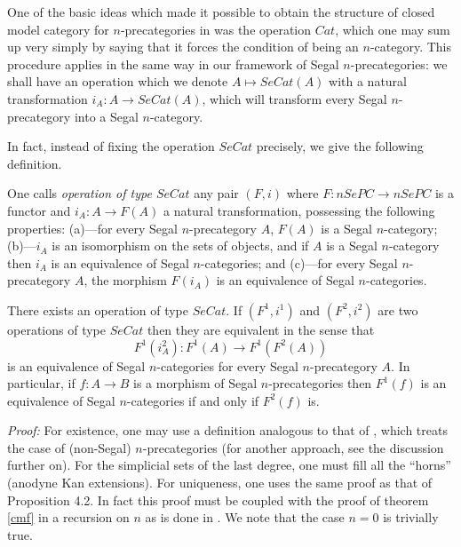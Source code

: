 
One of the basic ideas which made it possible to obtain the structure of
closed model category for $n$-precategories in \cite{nCAT} was
the operation $Cat$, which one may sum up very simply by saying that it forces
the condition of being an $n$-category. This procedure applies in the same
way in
our framework of Segal $n$-precategories: we shall have an operation which we
denote
$A\mapsto SeCat(A)$ with a natural transformation $i_A: A\rightarrow
SeCat(A)$, which will transform every Segal $n$-precategory into a
Segal $n$-category.

In fact, instead of fixing the operation $SeCat$ precisely, we
give the following definition.

\begin{definition}
\label{secat}
One calls {\em operation of type $SeCat$} any pair $(F, i)$ where
$F:nSePC\rightarrow nSePC$ is a functor and $i_A: A\rightarrow F(A)$ a
natural transformation, possessing the following properties:
\newline
(a)---for every Segal $n$-precategory $A$, $F(A)$ is a Segal
$n$-category;
\newline
(b)---$i_A$ is an isomorphism on the sets of objects, and if $A$ is a
Segal $n$-category then $i_A$ is an equivalence of Segal
$n$-categories; and
\newline
(c)---for every Segal $n$-precategory $A$, the morphism $F(i_A)$ is an
equivalence of Segal $n$-categories.
\end{definition}

\begin{lemma}
\label{secatunique}
There exists an operation of type $SeCat$. If $(F^1, i^1)$ and $(F^2, i^2)$
are two operations of type $SeCat$ then they are equivalent in the
sense that
$$
F^1(i^2_A): F^1(A) \rightarrow F^1(F^2(A))
$$
is an equivalence of Segal $n$-categories for every Segal $n$-precategory
$A$. In particular, if $f:A\rightarrow B$ is a morphism of
Segal $n$-precategories then $F^1(f)$ is an equivalence of Segal
$n$-categories if and only if $F^2(f)$ is.
\end{lemma}
{\em Proof:}
For existence, one may use a definition analogous to that of
\cite{nCAT}, which treats the case of (non-Segal) $n$-precategories (for
another approach, see the discussion
further on).
For the
simplicial sets of the last degree,
one must fill all the ``horns'' (anodyne Kan extensions). For uniqueness,
one uses the same proof as that of
\cite{nCAT} Proposition 4.2. In fact this proof must be coupled
with the proof of theorem \ref{cmf} in a recursion on $n$
as is done in \cite{nCAT}. We note that the case $n=0$ is trivially
true.

